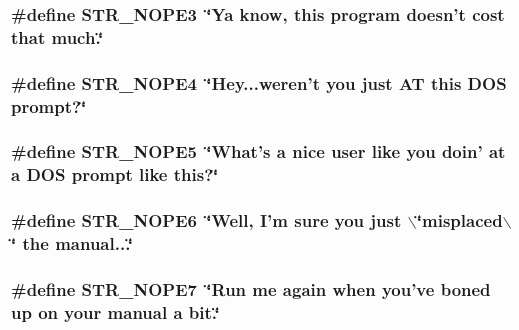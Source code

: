\label{F__SPEAR_8H_ae64af068db402eea930d2e29f0b69d51}
\hypertarget{F__SPEAR_8H_a15822f1d02b43db46d9ca0cbec39e1a5}{
\subsubsection[{STR\_\-NOPE3}]{\setlength{\rightskip}{0pt plus 5cm}\#define STR\_\-NOPE3~\char`\"{}Ya know, this program doesn't cost that much.\char`\"{}}}
\label{F__SPEAR_8H_a15822f1d02b43db46d9ca0cbec39e1a5}
\hypertarget{F__SPEAR_8H_a4e28ab0db4d5ac3034cd12a5c1c5be24}{
\subsubsection[{STR\_\-NOPE4}]{\setlength{\rightskip}{0pt plus 5cm}\#define STR\_\-NOPE4~\char`\"{}Hey...weren't you just AT this DOS prompt?\char`\"{}}}
\label{F__SPEAR_8H_a4e28ab0db4d5ac3034cd12a5c1c5be24}
\hypertarget{F__SPEAR_8H_a423da0470a73eb65085ea2f07f3bfd01}{
\subsubsection[{STR\_\-NOPE5}]{\setlength{\rightskip}{0pt plus 5cm}\#define STR\_\-NOPE5~\char`\"{}What's a nice user like you doin' at a DOS prompt like this?\char`\"{}}}
\label{F__SPEAR_8H_a423da0470a73eb65085ea2f07f3bfd01}
\hypertarget{F__SPEAR_8H_a72513a15d6c56dabf174f0b87bc380c7}{
\subsubsection[{STR\_\-NOPE6}]{\setlength{\rightskip}{0pt plus 5cm}\#define STR\_\-NOPE6~\char`\"{}Well, I'm sure you just $\backslash$\char`\"{}misplaced$\backslash$\char`\"{} the manual...\char`\"{}}}
\label{F__SPEAR_8H_a72513a15d6c56dabf174f0b87bc380c7}
\hypertarget{F__SPEAR_8H_a50f945542e840e45fb5dcff0fc689a1c}{
\subsubsection[{STR\_\-NOPE7}]{\setlength{\rightskip}{0pt plus 5cm}\#define STR\_\-NOPE7~\char`\"{}Run me again when you've boned up on your manual a bit.\char`\"{}}}
